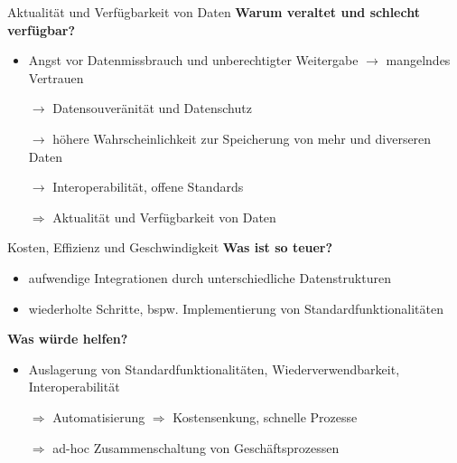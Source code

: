 \begin{frame}{Aktualität und Verfügbarkeit von Daten}
    \textbf{Warum veraltet und schlecht verfügbar?}
    \begin{itemize}
        \item Angst vor Datenmissbrauch und unberechtigter Weitergabe $\to$ mangelndes Vertrauen

        \pause
        \item[$\to$] Datensouveränität und Datenschutz
        \item[$\to$] höhere Wahrscheinlichkeit zur Speicherung von mehr und diverseren Daten

        \pause
        \item[$\to$] Interoperabilität, offene Standards

        \pause
        \item[$\Rightarrow$] Aktualität und Verfügbarkeit von Daten
    \end{itemize}
\end{frame}


\begin{frame}{Kosten, Effizienz und Geschwindigkeit}
    \textbf{Was ist so teuer?}
    \begin{itemize}
        \item aufwendige Integrationen durch unterschiedliche Datenstrukturen
        \item wiederholte Schritte, bspw. Implementierung von Standardfunktionalitäten
    \end{itemize}

    \pause
    \textbf{Was würde helfen?}
    \begin{itemize}
        \item Auslagerung von Standardfunktionalitäten, Wiederverwendbarkeit, Interoperabilität
        \item[$\Rightarrow$] Automatisierung $\Rightarrow$ Kostensenkung, schnelle Prozesse
        \item[$\Rightarrow$] ad-hoc Zusammenschaltung von Geschäftsprozessen
    \end{itemize}
\end{frame}


